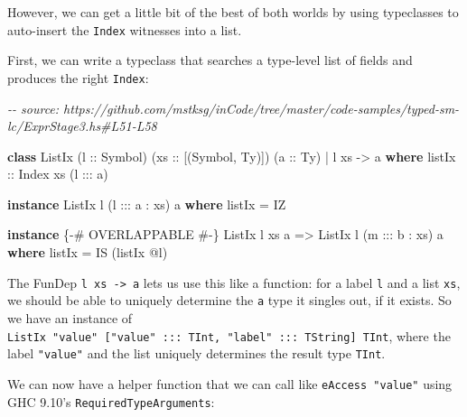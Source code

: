 \documentclass[]{article}
\newenvironment{Shaded}{}{}
\newcommand{\CommentTok}[1]{\textcolor[rgb]{0.38,0.63,0.69}{\textit{#1}}}
\newcommand{\DataTypeTok}[1]{\textcolor[rgb]{0.56,0.13,0.00}{#1}}
\newcommand{\KeywordTok}[1]{\textcolor[rgb]{0.00,0.44,0.13}{\textbf{#1}}}
\newcommand{\NormalTok}[1]{#1}
\newcommand{\OperatorTok}[1]{\textcolor[rgb]{0.40,0.40,0.40}{#1}}
\newcommand{\OtherTok}[1]{\textcolor[rgb]{0.00,0.44,0.13}{#1}}
\begin{document}
However, we can get a little bit of the best of both worlds by using typeclasses
to auto-insert the \texttt{Index} witnesses into a list.

First, we can write a typeclass that searches a type-level list of fields and
produces the right \texttt{Index}:

\begin{Shaded}
\begin{Highlighting}[]
\CommentTok{{-}{-} source: https://github.com/mstksg/inCode/tree/master/code{-}samples/typed{-}sm{-}lc/ExprStage3.hs\#L51{-}L58}

\KeywordTok{class} \DataTypeTok{ListIx}\NormalTok{ (}\OtherTok{l ::} \DataTypeTok{Symbol}\NormalTok{) (}\OtherTok{xs ::}\NormalTok{ [(}\DataTypeTok{Symbol}\NormalTok{, }\DataTypeTok{Ty}\NormalTok{)]) (}\OtherTok{a ::} \DataTypeTok{Ty}\NormalTok{) }\OperatorTok{|}\NormalTok{ l xs }\OtherTok{{-}\textgreater{}}\NormalTok{ a }\KeywordTok{where}
\OtherTok{  listIx ::} \DataTypeTok{Index}\NormalTok{ xs (l }\OperatorTok{:::}\NormalTok{ a)}

\KeywordTok{instance} \DataTypeTok{ListIx}\NormalTok{ l (l }\OperatorTok{:::}\NormalTok{ a }\OperatorTok{:}\NormalTok{ xs) a }\KeywordTok{where}
\NormalTok{  listIx }\OtherTok{=} \DataTypeTok{IZ}

\KeywordTok{instance} \OtherTok{\{{-}\# OVERLAPPABLE \#{-}\}} \DataTypeTok{ListIx}\NormalTok{ l xs a }\OtherTok{=\textgreater{}} \DataTypeTok{ListIx}\NormalTok{ l (m }\OperatorTok{:::}\NormalTok{ b }\OperatorTok{:}\NormalTok{ xs) a }\KeywordTok{where}
\NormalTok{  listIx }\OtherTok{=} \DataTypeTok{IS}\NormalTok{ (listIx }\OperatorTok{@}\NormalTok{l)}
\end{Highlighting}
\end{Shaded}

The FunDep \texttt{l\ xs\ -\textgreater{}\ a} lets us use this like a function:
for a label \texttt{l} and a list \texttt{xs}, we should be able to uniquely
determine the \texttt{a} type it singles out, if it exists. So we have an
instance of
\texttt{ListIx\ "value"\ {[}"value"\ :::\ TInt,\ "label"\ :::\ TString{]}\ TInt},
where the label \texttt{"value"} and the list uniquely determines the result
type \texttt{TInt}.

We can now have a helper function that we can call like
\texttt{eAccess\ "value"} using GHC 9.10's \texttt{RequiredTypeArguments}:
\end{document}

